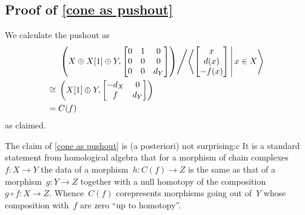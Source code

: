 \documentclass[a4paper,10pt]{scrartcl}
\begin{document}
\subsection{Proof of \cref{cone as pushout}}
\label{cone as pushout proof}

We calculate the pushout as
\begin{align*}
  {}&
  \left.
  \left(
    X \oplus X[1] \oplus Y,
    \begin{bmatrix}
      0 & 1 & 0   \\
      0 & 0 & 0   \\
      0 & 0 & d_Y
    \end{bmatrix}
  \right)
  \middle/
  \gen*{
    \begin{bmatrix}
          x  \\
        d(x) \\
      -f(x)
    \end{bmatrix}
  \suchthat*
    x \in X
  }
  \right.
  \\
  \iso{}&
  \left(
    X[1] \oplus Y,
    \begin{bmatrix}
      -d_X & 0   \\
        f   & d_Y
    \end{bmatrix}
  \right)
  \\
  ={}&
  C(f)
\end{align*}
as claimed.

\begin{remark}
  The claim of \cref{cone as pushout} is (a posteriori) not  surprising:c
  It is a standard statement from homological algebra that for a morphism of chain complexes~$f \colon X \to Y$ the data of a morphism~$h \colon C(f) \to Z$ is the same as that of a morphism~$g \colon Y \to Z$ together with a null homotopy of the composition~$g \circ f \colon X \to Z$.
  Whence~$C(f)$ corepresents morphisms going out of~$Y$ whose composition with~$f$ are zero \enquote{up to homotopy}.
\end{remark}
\end{document}
